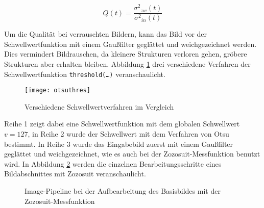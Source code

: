 \begin{equation}\label{eq:otsu}
    Q(t)=\frac{{\sigma^2}_{zw}(t)}{{\sigma^2}_{in}(t)}
\end{equation}

Um die Qualität bei verrauschten Bildern, kann das Bild vor der Schwellwertfunktion mit einem
Gaußfilter geglättet und weichgezeichnet werden. Dies vermindert Bildrauschen, da kleinere Strukturen 
verloren gehen, gröbere Strukturen aber erhalten bleiben. Abbildung \ref{fig:threshold} drei verschiedene 
Verfahren der Schwellwertfunktion \texttt{threshold(\dots)} veranschaulicht.  \cite{Opencv:2013}

\begin{figure}[H]
    \centering
    \texttt{[image: otsuthres]}
    \label{fig:threshold}
    \caption{Verschiedene Schwellwertverfahren im Vergleich \cite{Opencv:2013}}
\end{figure}

Reihe 1 zeigt dabei eine Schwellwertfunktion mit dem globalen Schwellwert $v=127$, in Reihe 2 wurde 
der Schwellwert mit dem Verfahren von Otsu bestimmt. In Reihe 3 wurde das Eingabebild zuerst mit einem 
Gaußfilter geglättet und weichgezeichnet, wie es auch bei der Zozosuit-Messfunktion benutzt wird. In Abbildung 
\ref{fig:thres_zozo} werden die einzelnen Bearbeitungsschritte eines Bildabschnittes mit Zozosuit veranschaulicht.


\begin{figure}[H]
    \centering
    \qquad 
    \qquad 
    \qquad 
    \label{fig:thres_zozo}
    \caption{Image-Pipeline bei der Aufbearbeitung des Basisbildes mit der Zozosuit-Messfunktion}
\end{figure}

